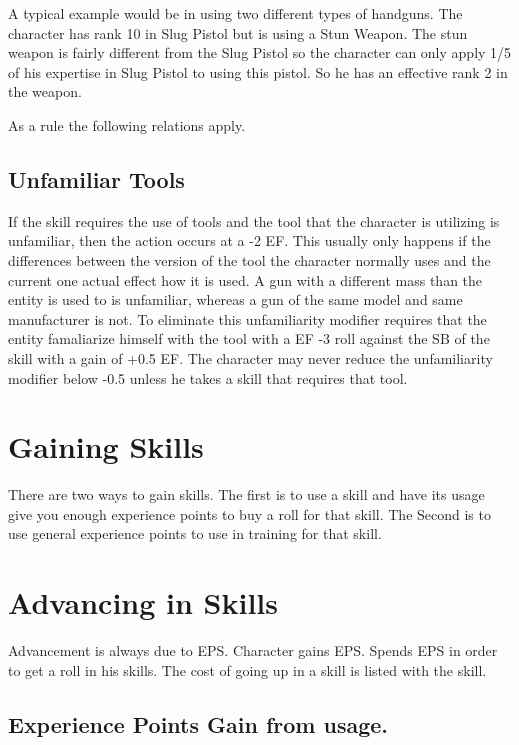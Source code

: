 A typical example would be in using two different types of handguns. The
character has rank 10 in Slug Pistol but is using a Stun Weapon. The stun
weapon is fairly different from the Slug Pistol so the character can only
apply 1/5 of his expertise in Slug Pistol to using this pistol. So he has
an effective rank 2 in the weapon.

As a rule the following relations apply.



\subsection{Unfamiliar Tools}

If the skill requires the use of tools and the tool that the character is
utilizing is unfamiliar, then the action occurs at a -2 EF. This usually
only happens if the differences between the version of the tool the
character normally uses and the current one actual effect how it is
used. A gun with a different mass than the entity is used to is
unfamiliar, whereas a gun of the same model and same manufacturer is
not. To eliminate this unfamiliarity modifier requires that the entity
famaliarize himself with the tool with a EF -3 roll against the SB of 
the skill with a gain of +0.5 EF. The character may never reduce the 
unfamiliarity modifier below -0.5 unless he takes a skill that 
requires that tool.

\section{Gaining Skills}

There are two ways to gain skills. The first is to use a skill and have
its usage give you enough experience points to buy a roll for that
skill. The Second is to use general experience points to use in
training for that skill.

\section{Advancing in Skills}

Advancement is always due to EPS. Character gains EPS. Spends EPS in order
to get a roll in his skills. The cost of going up in a skill is listed with
the skill.         

\subsection{Experience Points Gain from usage.}


